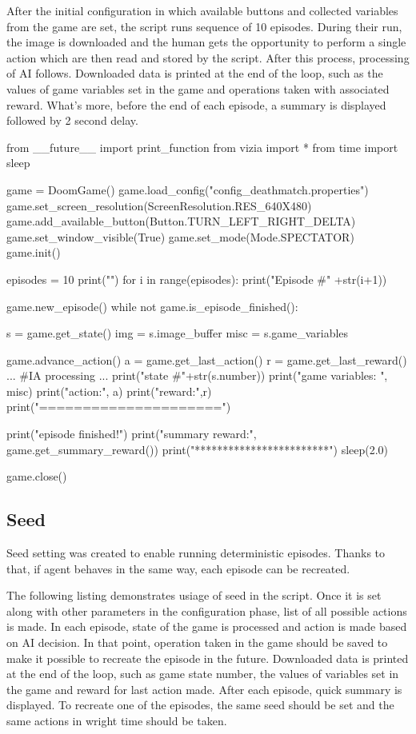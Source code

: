 After the initial configuration in which available buttons and collected variables from the game are set, the script runs sequence of 10 episodes. During their run, the image is downloaded and the human gets the opportunity to perform a single action which are then read and stored by the script. After this process, processing of AI follows. Downloaded data is printed at the end of the loop, such as the values of game variables set in the game and operations taken with associated reward. What's more, before the end of each episode, a summary is displayed followed by 2 second delay.

\begin{pblock}
from __future__ import print_function
from vizia import *
from time import sleep

game = DoomGame()
game.load_config("config_deathmatch.properties")
game.set_screen_resolution(ScreenResolution.RES_640X480)
game.add_available_button(Button.TURN_LEFT_RIGHT_DELTA)
game.set_window_visible(True)
game.set_mode(Mode.SPECTATOR)
game.init()

episodes = 10
print("")
for i in range(episodes):
	print("Episode #" +str(i+1))
	
	game.new_episode()
	while not game.is_episode_finished():
		
		s = game.get_state()
		img = s.image_buffer
		misc = s.game_variables

		game.advance_action()
		a = game.get_last_action()
		r = game.get_last_reward()
		...		
		#IA processing
		...
		print("state #"+str(s.number))
		print("game variables: ", misc)
		print("action:", a)
		print("reward:",r)
		print("=====================")

	
	print("episode finished!")
	print("summary reward:", game.get_summary_reward())
	print("************************")
	sleep(2.0)

game.close()
\end{pblock}

\subsection {Seed}
	Seed setting was created to enable running deterministic episodes. Thanks to that, if agent behaves in the same way, each episode can be recreated.

The following listing demonstrates usiage of seed in the script. Once it is set along with other parameters in the configuration phase, list of all possible actions is made. In each episode, state of the game is processed and action is made based on AI decision. In that point, operation taken in the game should be saved to make it possible to recreate the episode in the future. Downloaded data is printed at the end of the loop, such as game state number, the values of variables set in the game and reward for last action made. After each episode, quick summary is displayed. To recreate one of the episodes, the same seed should be set and the same actions in wright time should be taken.

